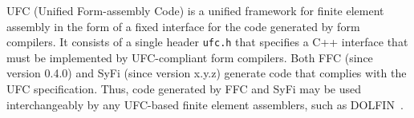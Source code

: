 UFC (Unified Form-assembly Code) is a unified framework for finite
element assembly in the form of a fixed interface for the code
generated by form compilers. It consists of a single header
\texttt{ufc.h} that specifies a C++ interface that must be implemented
by UFC-compliant form compilers. Both FFC (since version 0.4.0) and
SyFi (since version x.y.z) generate code that complies with the UFC
specification. Thus, code generated by FFC and SyFi may be used
interchangeably by any UFC-based finite element assemblers, such as
DOLFIN~\cite{www:dolfin,other}.
